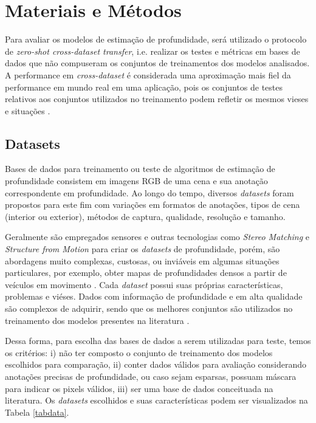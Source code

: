 
\chapter{Materiais e Métodos}

Para avaliar os modelos de estimação de profundidade, será utilizado o protocolo de \textit{zero-shot cross-dataset transfer}, i.e. realizar os testes e métricas em bases de dados que não compuseram os conjuntos de treinamentos dos modelos analisados. A performance em \textit{cross-dataset} é considerada uma aproximação mais fiel da performance em mundo real em uma aplicação, pois os conjuntos de testes relativos aos conjuntos utilizados no treinamento podem refletir os mesmos vieses e situações \cite{ranftl2020towards}.


\section{Datasets}

Bases de dados para treinamento ou teste de algoritmos de estimação de profundidade consistem em imagens RGB de uma cena e sua anotação correspondente em profundidade. Ao longo do tempo, diversos \textit{datasets} foram propostos para este fim com variações em formatos de anotações, tipos de cena (interior ou exterior), métodos de captura, qualidade, resolução e tamanho.


Geralmente são empregados sensores e outras tecnologias como \textit{Stereo Matching} e \textit{Structure from Motion} para criar os \textit{datasets} de profundidade, porém, são abordagens muito complexas, custosas, ou inviáveis em algumas situações particulares, por exemplo, obter mapas de profundidades densos a partir de veículos em movimento  \cite{yang2024depthv1}.
Cada \textit{dataset} possui suas próprias características, problemas e viéses. Dados com informação de profundidade e em alta qualidade são complexos de adquirir, sendo que os melhores conjuntos são utilizados no treinamento dos modelos presentes na literatura \cite{ranftl2020towards}. 



Dessa forma, para escolha das bases de dados a serem utilizadas para teste, temos os critérios: i) não ter composto o conjunto de treinamento dos modelos escolhidos para comparação, ii) conter dados válidos para avaliação considerando anotações precisas de profundidade, ou caso sejam esparsas, possuam máscara para indicar os pixels válidos, iii) ser uma base de dados conceituada na literatura. Os \textit{datasets} escolhidos e suas características podem ser visualizados na Tabela \ref{tabdata}.

